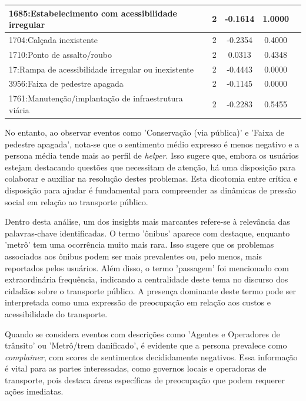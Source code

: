 \begin{table}[htbp]
\begin{tabular}{|l|c|c|c|c|}
		\hline
		1685:Estabelecimento com acessibilidade irregular    & 2                & -0.1614        & 1.0000           \\
		\hline
		1704:Calçada inexistente                             & 2                & -0.2354        & 0.4000           \\
		\hline
		1710:Ponto de assalto/roubo                          & 2                & 0.0313         & 0.4348           \\
		\hline
		17:Rampa de acessibilidade irregular ou inexistente  & 2                & -0.4443        & 0.0000           \\
		\hline
		3956:Faixa de pedestre apagada                       & 2                & -0.1145        & 0.0000           \\
		\hline
		1761:Manutenção/implantação de infraestrutura viária & 2                & -0.2283        & 0.5455           \\
		\hline
	\end{tabular}
\end{table}

No entanto, ao observar eventos como 'Conservação (via pública)' e 'Faixa de pedestre apagada', nota-se que o sentimento médio expresso é menos negativo e a persona média tende mais ao perfil de \textit{helper}. Isso sugere que, embora os usuários estejam destacando questões que necessitam de atenção, há uma disposição para colaborar e auxiliar na resolução destes problemas. Esta dicotomia entre crítica e disposição para ajudar é fundamental para compreender as dinâmicas de pressão social em relação ao transporte público.

Dentro desta análise, um dos insights mais marcantes refere-se à relevância das palavras-chave identificadas. O termo 'ônibus' aparece com destaque, enquanto 'metrô' tem uma ocorrência muito mais rara. Isso sugere que os problemas associados aos ônibus podem ser mais prevalentes ou, pelo menos, mais reportados pelos usuários. Além disso, o termo 'passagem' foi mencionado com extraordinária frequência, indicando a centralidade deste tema no discurso dos cidadãos sobre o transporte público. A presença dominante deste termo pode ser interpretada como uma expressão de preocupação em relação aos custos e acessibilidade do transporte.

Quando se considera eventos com descrições como 'Agentes e Operadores de trânsito' ou 'Metrô/trem danificado', é evidente que a persona prevalece como \textit{complainer}, com scores de sentimentos decididamente negativos. Essa informação é vital para as partes interessadas, como governos locais e operadoras de transporte, pois destaca áreas específicas de preocupação que podem requerer ações imediatas.

